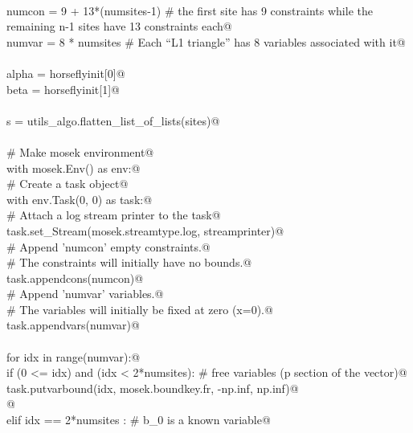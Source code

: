 \documentclass[11.5pt]{report}
\begin{document}
\begin{flushleft}
\begin{list}{}{}
\mbox{}\verb@@\\
\mbox{}\verb@    numcon = 9 + 13*(numsites-1) # the first site has 9 constraints while the remaining n-1 sites have 13 constraints each@\\
\mbox{}\verb@    numvar = 8 * numsites # Each ``L1 triangle'' has 8 variables associated with it@\\
\mbox{}\verb@@\\
\mbox{}\verb@    alpha = horseflyinit[0]@\\
\mbox{}\verb@    beta  = horseflyinit[1]@\\
\mbox{}\verb@@\\
\mbox{}\verb@    s = utils_algo.flatten_list_of_lists(sites)@\\
\mbox{}\verb@@\\
\mbox{}\verb@    # Make mosek environment@\\
\mbox{}\verb@    with mosek.Env() as env:@\\
\mbox{}\verb@        # Create a task object@\\
\mbox{}\verb@        with env.Task(0, 0) as task:@\\
\mbox{}\verb@            # Attach a log stream printer to the task@\\
\mbox{}\verb@            task.set_Stream(mosek.streamtype.log, streamprinter)@\\
\mbox{}\verb@            # Append 'numcon' empty constraints.@\\
\mbox{}\verb@            # The constraints will initially have no bounds.@\\
\mbox{}\verb@            task.appendcons(numcon)@\\
\mbox{}\verb@            # Append 'numvar' variables.@\\
\mbox{}\verb@            # The variables will initially be fixed at zero (x=0).@\\
\mbox{}\verb@            task.appendvars(numvar)@\\
\mbox{}\verb@@\\
\mbox{}\verb@            for idx in range(numvar):@\\
\mbox{}\verb@                if (0   <= idx) and (idx < 2*numsites): # free variables (p section of the vector)@\\
\mbox{}\verb@                    task.putvarbound(idx, mosek.boundkey.fr, -np.inf, np.inf)@\\
\mbox{}\verb@                    @\\
\mbox{}\verb@                elif  idx == 2*numsites : # b_0 is a known variable@\\

\end{list}
\end{flushleft}
\end{document}
